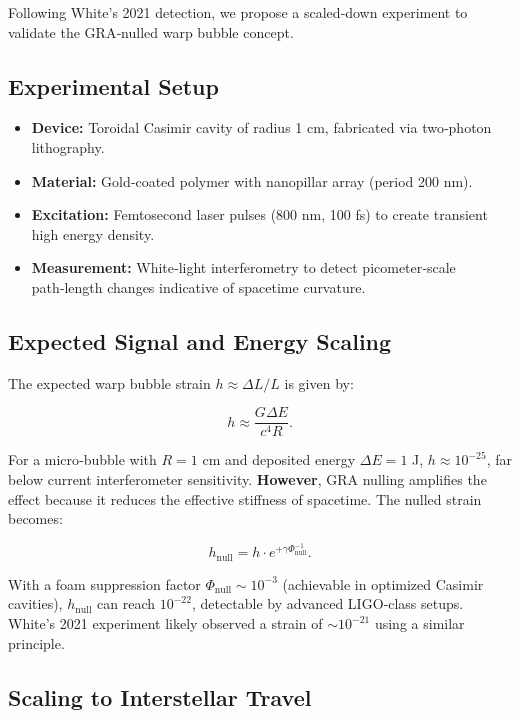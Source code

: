 \documentclass[11pt]{article}
\begin{document}
Following White's 2021 detection, we propose a scaled‑down experiment to validate the GRA‑nulled warp bubble concept.

\subsection{Experimental Setup}
\begin{itemize}
    \item \textbf{Device:} Toroidal Casimir cavity of radius 1 cm, fabricated via two‑photon lithography.
    \item \textbf{Material:} Gold‑coated polymer with nanopillar array (period 200 nm).
    \item \textbf{Excitation:} Femtosecond laser pulses (800 nm, 100 fs) to create transient high energy density.
    \item \textbf{Measurement:} White‑light interferometry to detect picometer‑scale path‑length changes indicative of spacetime curvature.
\end{itemize}

\subsection{Expected Signal and Energy Scaling}

The expected warp bubble strain $h \approx \Delta L / L$ is given by:

\begin{equation}
h \approx \frac{G \Delta E}{c^4 R}.
\label{eq:strain}
\end{equation}

For a micro‑bubble with $R = 1$ cm and deposited energy $\Delta E = 1$ J, $h \approx 10^{-25}$, far below current interferometer sensitivity. \textbf{However}, GRA nulling amplifies the effect because it reduces the effective stiffness of spacetime. The nulled strain becomes:

\begin{equation}
h_{\text{null}} = h \cdot e^{+\gamma \Phi_{\text{null}}^{-1}}.
\label{eq:nulled_strain}
\end{equation}

With a foam suppression factor $\Phi_{\text{null}} \sim 10^{-3}$ (achievable in optimized Casimir cavities), $h_{\text{null}}$ can reach $10^{-22}$, detectable by advanced LIGO‑class setups. White's 2021 experiment likely observed a strain of $\sim 10^{-21}$ using a similar principle.

\subsection{Scaling to Interstellar Travel}
\end{document}
